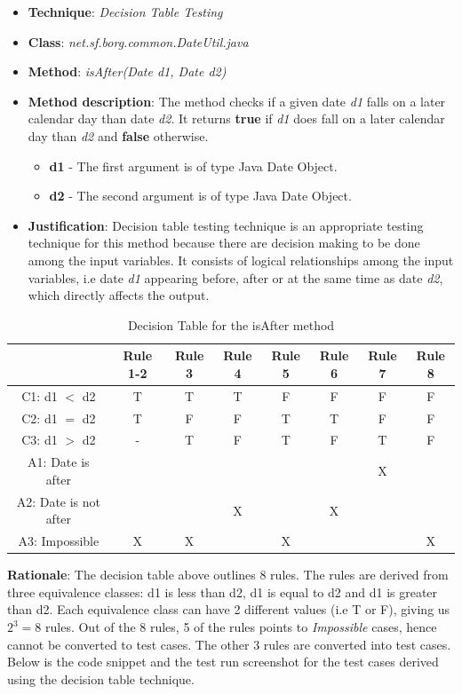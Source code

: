 \documentclass[fontsize=12pt,paper=letter,twoside]{scrartcl}
\begin{document}
\begin{itemize}
\item \textbf{Technique}: \emph{Decision Table Testing}
\item \textbf{Class}: \emph{net.sf.borg.common.DateUtil.java}
\item \textbf{Method}: \emph{isAfter(Date d1, Date d2)}
\item \textbf{Method description}: The method checks if a given date \emph{d1} falls on a later calendar day than date \emph{d2}. It returns \textbf{true} if \emph{d1} does fall on a later calendar day than \emph{d2} and \textbf{false} otherwise.
\begin{itemize}
\item \textbf{d1} - The first argument is of type Java Date Object.
\item \textbf{d2} - The second argument is of type Java Date Object.
\end{itemize}
\item \textbf{Justification}: Decision table testing technique is an appropriate testing technique for this method because there are decision making to be done among the input variables. It consists of logical relationships among the input variables, i.e date \emph{d1} appearing before, after or at the same time as date \emph{d2}, which directly affects the output.
\end{itemize}

\begin{table}[h]
\centering
\begin{tabular}{|c | c | c | c | c | c | c | c |}
	\cline{1-8}
	& \textbf{Rule 1-2} & \textbf{Rule 3} & \textbf{Rule 4} & \textbf{Rule 5} & \textbf{Rule 6} & \textbf{Rule 7} & \textbf{Rule 8}\\ \hline
	C1: d1 $<$ d2 & T & T & T & F & F & F & F \\ \hline
	C2: d1 $=$ d2 & T & F & F & T & T & F & F \\ \hline
	C3: d1 $>$ d2 & - & T & F & T & F & T & F \\ \Xhline{2pt}
	A1: Date is after & & & & & & X & \\ \hline
	A2: Date is not after & & & X & & X & & \\ \hline
	A3: Impossible & X & X & & X & & & X \\ \hline
\end{tabular}
\caption {Decision Table for the isAfter method}
\label{tbl:trace_matrix}
\end{table}

\noindent \textbf{Rationale}: The decision table above outlines 8 rules. The rules are derived from three equivalence classes: d1 is less than d2, d1 is equal to d2 and d1 is greater than d2. Each equivalence class can have 2 different values (i.e T or F), giving us $2^3 = 8$ rules. Out of the 8 rules, 5 of the rules points to \emph{Impossible} cases, hence cannot be converted to test cases. The other 3 rules are converted into test cases. Below is the code snippet and the test run screenshot for the test cases derived using the decision table technique.
\end{document}
